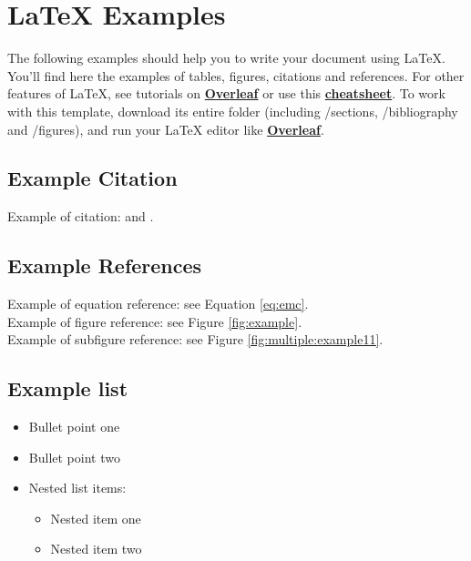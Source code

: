 \appendix
\label{sec:appendix}

\section{\LaTeX{} Examples}
The following examples should help you to write your document using \LaTeX{}. You'll find here the examples of tables, figures, citations and references. For other features of \LaTeX{}, see tutorials on \href{https://www.overleaf.com/learn}{\textbf{Overleaf}} or use this \href{https://wch.github.io/latexsheet/}{\textbf{cheatsheet}}. To work with this template, download its entire folder (including /sections, /bibliography and /figures), and run your \LaTeX{} editor like \href{https://www.overleaf.com}{\textbf{Overleaf}}.


\subsection*{Example Citation}
Example of citation: \cite{Smith_2013} and \cite{Smith_2012}. 


\subsection*{Example References}
Example of equation reference: see Equation \eqref{eq:emc}. \\
Example of figure reference: see Figure \ref{fig:example}.\\
Example of subfigure reference: see Figure \ref{fig:multiple:example11}.\\


\subsection*{Example list}
\begin{itemize}
\item Bullet point one
\item Bullet point two
\item Nested list items:
\begin{itemize}
\item Nested item one
\item Nested item two
\end{itemize}
\end{itemize}

